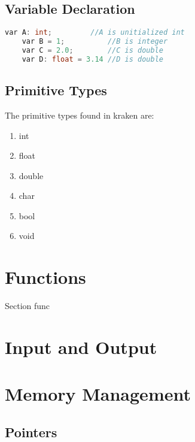 \documentclass{article}
\begin{document}
\subsection{Variable Declaration}
  \begin{lstlisting}[language=C++]
    var A: int;         //A is unitialized int
    var B = 1;          //B is integer
    var C = 2.0;        //C is double
    var D: float = 3.14 //D is double

  \end{lstlisting}
\subsection{Primitive Types}
  The primitive types found in kraken are:
    \begin{enumerate}
      \item int
      \item float
      \item double
      \item char
      \item bool
      \item void
    \end{enumerate}

\section{Functions}
  Section func

\section{Input and Output}

\section{Memory Management}
  \subsection{Pointers}
\end{document}
